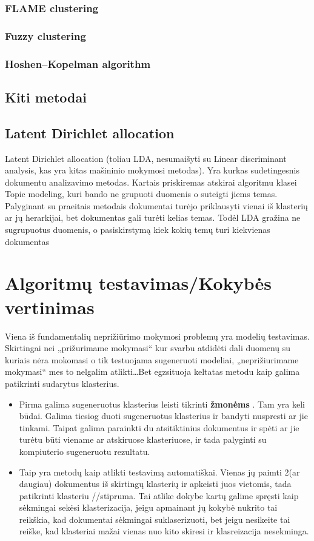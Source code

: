 \documentclass{VUMIFInfKursinis}
\begin{document}
\subsubsection{FLAME clustering}
\subsubsection{Fuzzy clustering}
\subsubsection{Hoshen–Kopelman algorithm}

\subsection{Kiti metodai}

\subsection{Latent Dirichlet allocation}
Latent Dirichlet allocation (toliau LDA, nesumaišyti su Linear discriminant analysis, kas yra kitas mašininio mokymosi metodas). Yra kurkas sudetingesnis dokumentu analizavimo metodas. Kartais priskiremas atskirai algoritmu klasei Topic modeling, kuri bando ne grupuoti duomenis o suteigti jiems temas. Palyginant su praeitais metodais dokumentai turėjo priklausyti vienai iš klasterių ar jų herarkijai, bet dokumentas gali turėti kelias temas. 
Todėl LDA gražina ne sugrupuotus duomenis, o pasiskirstymą kiek kokių temų turi kiekvienas dokumentas  

\section{Algoritmų testavimas/Kokybės vertinimas}
Viena iš fundamentalių neprižiūrimo mokymosi problemų yra modelių testavimas. Skirtingai nei „prižurimame mokymasi“ kur svarbu atdidėti dali duomenų su kuriais nėra mokomasi o tik testuojama sugeneruoti modeliai, „neprižiurimame mokymasi“ mes to nelgalim atlikti\ldots Bet egzsituoja keltatas metodu kaip galima patikrinti sudarytus klasterius.
\begin{itemize}
	\item Pirma galima sugeneruotus klasterius leisti tikrinti \textbf{žmonėms }. Tam yra keli būdai. Galima tiesiog duoti sugeneruotus klasterius ir bandyti nuspresti ar jie tinkami. Taipat galima parainkti du atsitiktinius dokumentus ir spėti ar jie turėtu būti viename ar atskiruose klasteriuose, ir tada palyginti su kompiuterio sugeneruotu rezultatu. 
	\item Taip yra metodų kaip atlikti testavimą automatiškai. Vienas jų paimti 2(ar daugiau) dokumentus iš skirtingų klasterių ir apkeisti juos vietomis, tada patikrinti klasteriu //stipruma. Tai atlike dokybe kartų galime spręsti kaip sėkmingai sekėsi klasterizacija, jeigu apmainant jų kokybė nukrito tai reikškia, kad dokumentai sėkmingai suklaserizuoti, bet jeigu nesikeite tai reiške, kad klasteriai mažai vienas nuo kito skiresi ir klasreizacija nesekminga.
\end{itemize}
\end{document}
